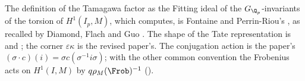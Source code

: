 The definition of the Tamagawa factor as the Fitting ideal of the $G_{\Q_p}$-invariants of the torsion of $H^1(I_p,M)$, which  computes, is
Fontaine and Perrin-Riou's \cite[I.4.2.2]{FPR94}, as recalled by Diamond, Flach and Guo \cite[p.~708]{DFG04}. The shape of the Tate representation is
\cite[Chapter V]{SilvermanATAEC} and \cite[Theorem 3.1(e)]{DDT}; the corner $\varepsilon\kappa$ is the revised paper's. The conjugation action is the paper's
$(\sigma\cdot c)(i)=\sigma c(\sigma^{-1}i\sigma)$; with the other common convention the Frobenius acts on $H^1(I,M)$ by $q\rho_M(\Frob)^{-1}$ ().
